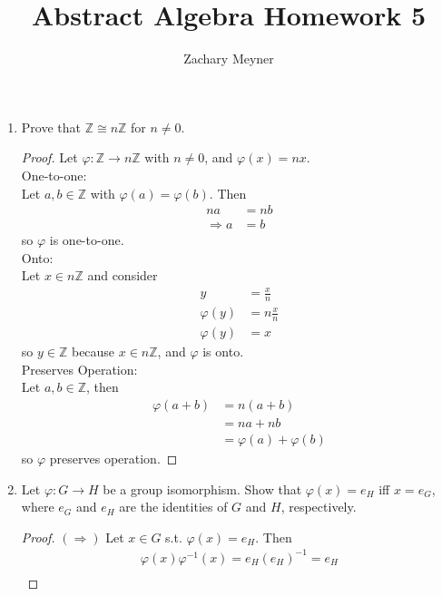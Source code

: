 \documentclass[12pt]{article}
\title{\large Abstract Algebra Homework 5}
\author{\large Zachary Meyner}
\date{}
\newcommand\setitemnumber[1]{\setcounter{enumi}{\numexpr#1-1\relax}}
\begin{document}
\maketitle
\begin{enumerate}[label=\textbf{\arabic*}.]
	\setitemnumber{2}
	\item Prove that $\mathbb{Z} \cong n\mathbb{Z}$ for $n \neq 0$.
	      \begin{proof} Let $\varphi: \mathbb{Z}\rightarrow n\mathbb{Z}$ with $n \neq 0$, and $\varphi(x) = nx$. \\
		      One-to-one: \\
		      Let $a,b \in \mathbb{Z}$ with $\varphi(a) = \varphi(b)$. Then
		      \begin{align*}
			      na            & = nb \\
			      \Rightarrow a & = b
		      \end{align*}
		      so $\varphi$ is one-to-one. \\
		      Onto: \\
		      Let $x \in n\mathbb{Z}$ and consider
		      \begin{align*}
			      y          & = \frac{x}{n}  \\
			      \varphi(y) & = n\frac{x}{n} \\
			      \varphi(y) & = x
		      \end{align*}
		      so $y \in \mathbb{Z}$ because $x \in n\mathbb{Z}$, and $\varphi$ is onto. \\
		      Preserves Operation: \\
		      Let $a,b \in \mathbb{Z}$, then
		      \begin{align*}
			      \varphi(a+b) & = n(a+b)                  \\
			                   & = na+nb                   \\
			                   & = \varphi(a) + \varphi(b)
		      \end{align*}
		      so $\varphi$ preserves operation.
	      \end{proof}
	      \setitemnumber{26}
	\item Let $\varphi: G \rightarrow H$ be a group isomorphism. Show that $\varphi(x) = e_H$ iff $x = e_G$,
	      where $e_G$ and $e_H$ are the identities of $G$ and $H$, respectively.
	      \begin{proof}$(\Rightarrow)$ Let $x \in G$ s.t. $\varphi(x) = e_H$. Then
            \begin{align*}
                \varphi(x)\varphi^{-1}(x) = e_H{(e_{H})}^{-1} = e_H \\

\end{align*}
\end{proof}
\end{enumerate}
\end{document}
